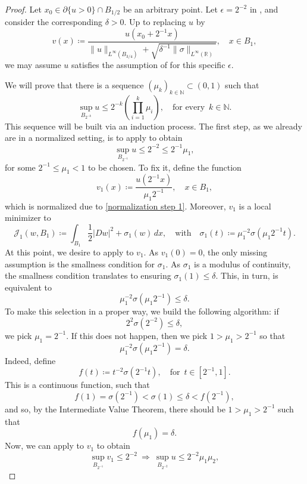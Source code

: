 \documentclass[reqno,11pt]{amsart}
\newcommand{\1}{\mathds{1}}  %
\numberwithin{equation}{section}
\begin{document}
\begin{proof}
Let $x_0 \in \partial \{u>0\} \cap B_{1/2}$ be an arbitrary point. Let $\epsilon = 2^{-2}$ in , and consider the corresponding $\delta >0$. Up to replacing $u$ by
$$
    v(x) \coloneqq \frac{u(x_0 + 2^{-1}x)}{\|u\|_{L^\infty(B_{3/4})} + \sqrt{\delta^{-1}\|\sigma\|_{L^\infty(\mathbb{R})}}}, \quad x \in B_1,
$$
we may assume $u$ satisfies the assumption of  for this specific $\epsilon$.

We will prove that there is a sequence $(\mu_k)_{k \in \mathbb{N}} \subset (0,1)$ such that
$$
    \sup_{B_{2^{-k}}}u \leq 2^{-k}\left(\prod_{i=1}^{k}\mu_i\right), \quad \text{for every }\, k \in \mathbb{N}.
$$
This sequence will be built via an induction process. The first step, as we already are in a normalized setting, is to apply  to obtain
\begin{equation}\label{normalization step 1}
    \sup_{B_{2^{-1}}} u \leq  2^{-2} \leq 2^{-1} \mu_1,
\end{equation}
for some $2^{-1} \leq \mu_1 < 1$ to be chosen. To fix it, define the function
$$
    v_1(x) \coloneqq \frac{u\left(2^{-1}x\right)}{\mu_1 2^{-1}}, \quad x \in B_1,
$$
which is normalized due to \eqref{normalization step 1}. Moreover, $v_1$ is a local minimizer to
$$
    \mathcal{J}_1(w, B_1) \coloneqq \int_{B_1}\frac{1}{2}|Dw|^2 + \sigma_1(w)\, dx, \quad \text{with} 
    \quad \sigma_1(t) \coloneqq \mu_1^{-2}\sigma\left(\mu_1 2^{-1} t\right).
$$
At this point, we desire to apply  to $v_1$. As $v_1(0) = 0$, the only missing assumption is the smallness condition for $\sigma_1$. As $\sigma_1$ is a modulus of continuity, the smallness condition translates to ensuring $\sigma_1(1) \leq \delta$. This, in turn, is equivalent to
$$
    \mu_1^{-2}\sigma\left(\mu_1 2^{-1}\right) \leq \delta.
$$
To make this selection in a proper way, we build the following algorithm: if 
$$
   2^2\sigma\left(2^{-2}\right) \leq \delta,
$$
we pick $\mu_1 = 2^{-1}$. If this does not happen, then we pick $1 > \mu_1 > 2^{-1}$ so that
$$
    \mu_1^{-2}\sigma(\mu_1 2^{-1}) = \delta.
$$
Indeed, define
$$
    f(t) \coloneqq t^{-2} \sigma(2^{-1}t), \quad \text{for }\, t \in [2^{-1},1].
$$
This is a continuous function, such that 
$$f(1) = \sigma(2^{-1}) < \sigma(1) \leq \delta < f(2^{-1}),$$
and so, by the Intermediate Value Theorem, there should be $1 > \mu_1 > 2^{-1}$ such that 
$$
    f(\mu_1) = \delta.
$$
Now, we can apply  to $v_1$ to obtain
$$
    \sup_{B_{2^{-1}}} v_1 \leq 2^{-2} \ \Longrightarrow \ \sup_{B_{2^{-2}}} u \leq 2^{-2} \mu_1 \mu_2,
$$
\end{proof}
\end{document}
